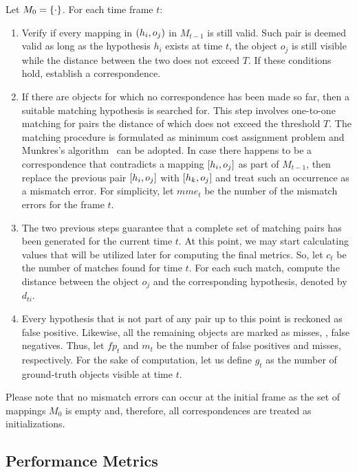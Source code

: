 Let $M_0 = \left\{ {\cdot} \right\}$. For each time frame $t$:
\begin{enumerate}
    \item Verify if every mapping in $\left( {h_i, o_j} \right)$ in $M_{t - 1}$ is still valid. Such pair is deemed valid as long as the hypothesis $h_i$ exists at time $t$, the object $o_j$ is still visible while the distance between the two does not exceed $T$. If these conditions hold, establish a correspondence.
    \item If there are objects for which no correspondence has been made so far, then a suitable matching hypothesis is searched for. This step involves one-to-one matching for pairs the distance of which does not exceed the threshold $T$. The matching procedure is formulated as minimum cost assignment problem and Munkres's algorithm~\cite{munkres1957assignment} can be adopted. In case there happens to be a correspondence that contradicts a mapping $\left[ {h_i, o_j} \right]$ as part of $M_{t - 1}$, then replace the previous pair $\left[ {h_i, o_j} \right]$ with $\left[ {h_k, o_j} \right]$ and treat such an occurrence as a mismatch error. For simplicity, let $mme_t$ be the number of the mismatch errors for the frame $t$.
    \item The two previous steps guarantee that a complete set of matching pairs has been generated for the current time $t$. At this point, we may start calculating values that will be utilized later for computing the final metrics. So, let $c_t$ be the number of matches found for time $t$. For each such match, compute the distance between the object $o_j$ and the corresponding hypothesis, denoted by $d_{ti}$.
    \item Every hypothesis that is not part of any pair up to this point is reckoned as false positive. Likewise, all the remaining objects are marked as misses, \ietext{}, false negatives. Thus, let $fp_t$ and $m_t$ be the number of false positives and misses, respectively. For the sake of computation, let us define $g_t$ as the number of ground-truth objects visible at time $t$.
\end{enumerate}

Please note that no mismatch errors can occur at the initial frame as the set of mappings $M_0$ is empty and, therefore, all correspondences are treated as initializations.

\subsection{Performance Metrics}

